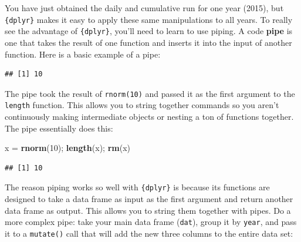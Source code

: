 \documentclass[]{book}
\newenvironment{Shaded}{\begin{snugshade}}{\end{snugshade}}
\newcommand{\DataTypeTok}[1]{\textcolor[rgb]{0.13,0.29,0.53}{#1}}
\newcommand{\DecValTok}[1]{\textcolor[rgb]{0.00,0.00,0.81}{#1}}
\newcommand{\KeywordTok}[1]{\textcolor[rgb]{0.13,0.29,0.53}{\textbf{#1}}}
\newcommand{\NormalTok}[1]{#1}
\newcommand{\OperatorTok}[1]{\textcolor[rgb]{0.81,0.36,0.00}{\textbf{#1}}}
\newcommand{\StringTok}[1]{\textcolor[rgb]{0.31,0.60,0.02}{#1}}
\begin{document}
You have just obtained the daily and cumulative run for one year (2015), but \texttt{\{dplyr\}} makes it easy to apply these same manipulations to all years. To really see the advantage of \texttt{\{dplyr\}}, you'll need to learn to use piping. A code \textbf{pipe} is one that takes the result of one function and inserts it into the input of another function. Here is a basic example of a pipe:

\begin{Shaded}
\end{Shaded}

\begin{verbatim}
## [1] 10
\end{verbatim}

The pipe took the result of \texttt{rnorm(10)} and passed it as the first argument to the \texttt{length} function. This allows you to string together commands so you aren't continuously making intermediate objects or nesting a ton of functions together. The pipe essentially does this:

\begin{Shaded}
\begin{Highlighting}[]
\NormalTok{x =}\StringTok{ }\KeywordTok{rnorm}\NormalTok{(}\DecValTok{10}\NormalTok{); }\KeywordTok{length}\NormalTok{(x); }\KeywordTok{rm}\NormalTok{(x)}
\end{Highlighting}
\end{Shaded}

\begin{verbatim}
## [1] 10
\end{verbatim}

The reason piping works so well with \texttt{\{dplyr\}} is because its functions are designed to take a data frame as input as the first argument and return another data frame as output. This allows you to string them together with pipes. Do a more complex pipe: take your main data frame (\texttt{dat}), group it by \texttt{year}, and pass it to a \texttt{mutate()} call that will add the new three columns to the entire data set:

\begin{Shaded}
\end{Shaded}
\end{document}

